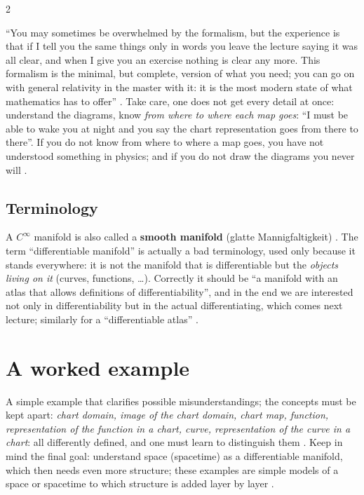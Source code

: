 \begin{paracol}{2}
\begin{aside}
``You may sometimes be overwhelmed by the formalism, but the experience is that if I tell you the same things only in words
you leave the lecture saying it was all clear, and when I give you an exercise nothing is clear any more. This formalism is
the minimal, but complete, version of what you need; you can go on with general relativity in the master with it: it is the
most modern state of what mathematics has to offer''
. Take care, one does not get every detail at once: understand the diagrams, know
\emph{from where to where each map goes}: ``I must be able to wake you at night and you say the chart representation goes
from there to there''. If you do not know from where to where a map goes, you have not understood something in physics;
and if you do not draw the diagrams you never will .
\end{aside}

\subsection{Terminology}\label{ssec:dm-terminology}

A $C^\infty$ manifold is also called a \textbf{smooth manifold} (glatte Mannigfaltigkeit) .
The term ``differentiable manifold'' is actually a bad terminology, used only because it stands everywhere: it is not
the manifold that is differentiable but the \emph{objects living on it} (curves, functions, \dots). Correctly it should be
``a manifold with an atlas that allows definitions of differentiability'', and in the end we are interested not only in
differentiability but in the actual differentiating, which comes next lecture; similarly for a ``differentiable atlas''
.

\section{A worked example}\label{sec:dm-example}

A simple example that clarifies possible misunderstandings; the concepts must be kept apart: \emph{chart domain, image of
the chart domain, chart map, function, representation of the function in a chart, curve, representation of the curve in
a chart}: all differently defined, and one must learn to distinguish them .
Keep in mind the final goal: understand space (spacetime) as a differentiable manifold, which then needs even more
structure; these examples are simple models of a space or spacetime to which structure is added layer by layer
.


\end{paracol}
